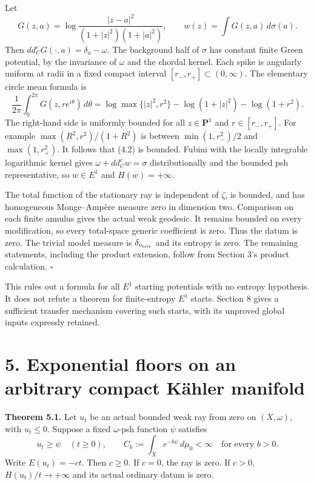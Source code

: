 \documentclass[
  11pt,
]{article}
\begin{document}
Let \[
 G(z,a)=\log\frac{|z-a|^2}{(1+|z|^2)(1+|a|^2)},
 \qquad w(z)=\int G(z,a)\,d\sigma(a).                       \tag{4.2}
\] Then \(dd^c_CG(\cdot,a)=\delta_a-\omega\). The background half of
\(\sigma\) has constant finite Green potential, by the invariance of
\(\omega\) and the chordal kernel. Each spike is angularly uniform at
radii in a fixed compact interval \([r_-,r_+]\subset(0,\infty)\). The
elementary circle mean formula is \[
 \frac1{2\pi}\int_0^{2\pi}G(z,re^{i\theta})\,d\theta
 =\log\max\{|z|^2,r^2\}-\log(1+|z|^2)-\log(1+r^2).
\] The right-hand side is uniformly bounded for all \(z\in\mathbf P^1\)
and \(r\in[r_-,r_+]\). For example \(\max(R^2,r^2)/(1+R^2)\) is between
\(\min(1,r_-^2)/2\) and \(\max(1,r_+^2)\). It follows that (4.2) is
bounded. Fubini with the locally integrable logarithmic kernel gives
\(\omega+dd^c_Cw=\sigma\) distributionally and the bounded psh
representative, so \(w\in E^1\) and \(H(w)=+\infty\).

The total function of the stationary ray is independent of \(\zeta\), is
bounded, and has homogeneous Monge--Ampère measure zero in dimension
two. Comparison on each finite annulus gives the actual weak geodesic.
It remains bounded on every modification, so every total-space generic
coefficient is zero. Thus the datum is zero. The trivial model measure
is \(\delta_{v_{\rm triv}}\) and its entropy is zero. The remaining
statements, including the product extension, follow from Section 3's
product calculation. \(\square\)

This rules out a formula for all \(E^1\) starting potentials with no
entropy hypothesis. It does not refute a theorem for finite-entropy
\(E^1\) starts. Section 8 gives a sufficient transfer mechanism covering
such starts, with its unproved global inputs expressly retained.

\section{5. Exponential floors on an arbitrary compact Kähler
manifold}\label{exponential-floors-on-an-arbitrary-compact-kuxe4hler-manifold}

\textbf{Theorem 5.1.} Let \(u_t\) be an actual bounded weak ray from
zero on \((X,\omega)\), with \(u_t\leq0\). Suppose a fixed
\(\omega\)-psh function \(\psi\) satisfies \[
 u_t\geq\psi\quad(t\geq0),\qquad
 C_b:=\int_Xe^{-b\psi}\,d\mu_0<\infty\quad\text{for every }b>0.
                                                               \tag{5.1}
\] Write \(E(u_t)=-ct\). Then \(c\geq0\). If \(c=0\), the ray is zero.
If \(c>0\), \(H(u_t)/t\to+\infty\) and its actual ordinary datum is
zero.
\end{document}
